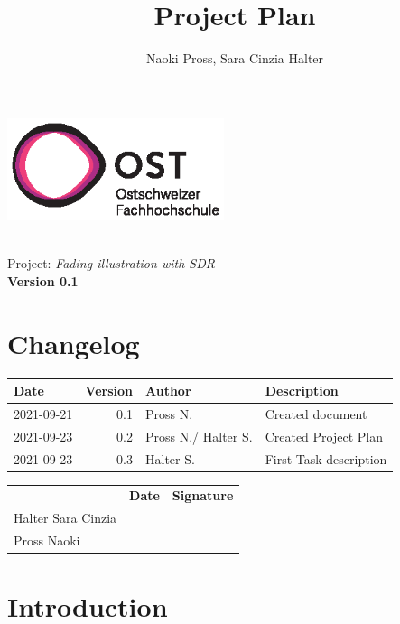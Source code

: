 \documentclass[a4paper, twosided, 11pt]{scrartcl}
\title{Project Plan}
\author{Naoki Pross, Sara Cinzia Halter}
\begin{document}
\begin{titlepage}
	\includegraphics[height=3cm]{fig/ost-logo}
	\begin{flushright}
		\vspace{5cm}
		{\Huge \bfseries \thetitle} \\
		\vspace{5mm}
		{\LARGE Project: \textit{Fading illustration with SDR}} \\
		\vspace{5mm}
		{\LARGE \bfseries Version 0.1}
	\end{flushright}
\end{titlepage}

\section*{Changelog}
\begin{tabularx}{\textwidth}{lrlX}
	\toprule
	\bfseries Date & \bfseries Version & \bfseries Author & \bfseries Description \\
	\midrule
	2021-09-21 & 0.1 & Pross N.  & Created document \\
	2021-09-23 & 0.2 & Pross N./ Halter S. & Created Project Plan \\
	2021-09-23 & 0.3 & Halter S. & First Task description \\
	\bottomrule
\end{tabularx}

\vfill
{
	\renewcommand{\arraystretch}{2}
	\begin{tabularx}{\textwidth}{lp{}X}
		                   & \bfseries Date & \bfseries Signature\\
		Halter Sara Cinzia & \hrulefill & \hrulefill \\
		Pross Naoki        & \hrulefill & \hrulefill \\
	\end{tabularx}
}

\clearpage
\tableofcontents
\listoffigures
\listoftables
\clearpage

\section{Introduction}
\end{document}
